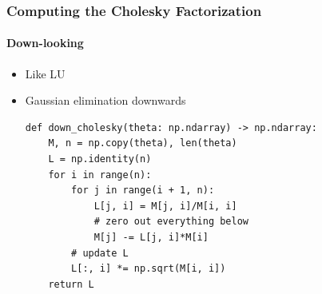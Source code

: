 \documentclass{beamer}                             %
\begin{document}
\begin{frame}[fragile]
\frametitle{Computing the Cholesky Factorization}
\framesubtitle{Down-looking}
\begin{itemize}
  \item Like LU
  \item Gaussian elimination downwards
    \begin{verbatim}
def down_cholesky(theta: np.ndarray) -> np.ndarray:
    M, n = np.copy(theta), len(theta)
    L = np.identity(n)
    for i in range(n):
        for j in range(i + 1, n):
            L[j, i] = M[j, i]/M[i, i]
            # zero out everything below
            M[j] -= L[j, i]*M[i]
        # update L
        L[:, i] *= np.sqrt(M[i, i])
    return L
    \end{verbatim}
\end{itemize}
\end{frame}
\end{document}

